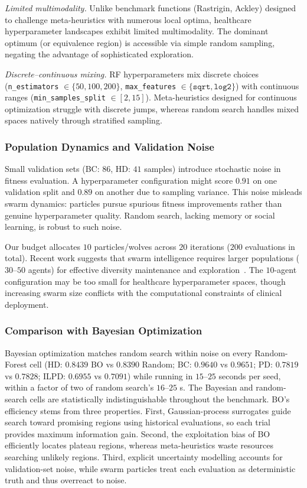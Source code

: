 \documentclass[letterpaper, 10 pt, conference]{ieeeconf}
\begin{document}
\emph{Limited multimodality.} Unlike benchmark functions (Rastrigin, Ackley) designed to challenge meta-heuristics with numerous local optima, healthcare hyperparameter landscapes exhibit limited multimodality. The dominant optimum (or equivalence region) is accessible via simple random sampling, negating the advantage of sophisticated exploration.

\emph{Discrete--continuous mixing.} RF hyperparameters mix discrete choices (\texttt{n\_estimators} $\in \{50, 100, 200\}$, \texttt{max\_features} $\in \{\texttt{sqrt}, \texttt{log2}\}$) with continuous ranges (\texttt{min\_samples\_split} $\in [2, 15]$). Meta-heuristics designed for continuous optimization struggle with discrete jumps, whereas random search handles mixed spaces natively through stratified sampling.

\subsubsection{Population Dynamics and Validation Noise}

Small validation sets (BC: $86$, HD: $41$ samples) introduce stochastic noise in fitness evaluation. A hyperparameter configuration might score $0.91$ on one validation split and $0.89$ on another due to sampling variance. This noise misleads swarm dynamics: particles pursue spurious fitness improvements rather than genuine hyperparameter quality. Random search, lacking memory or social learning, is robust to such noise.

Our budget allocates $10$ particles/wolves across $20$ iterations ($200$ evaluations in total). Recent work suggests that swarm intelligence requires larger populations ($30$--$50$ agents) for effective diversity maintenance and exploration~\cite{gong2015}. The $10$-agent configuration may be too small for healthcare hyperparameter spaces, though increasing swarm size conflicts with the computational constraints of clinical deployment.

\subsubsection{Comparison with Bayesian Optimization}

Bayesian optimization matches random search within noise on every Random-Forest cell (HD: $0.8439$ BO vs $0.8390$ Random; BC: $0.9640$ vs $0.9651$; PD: $0.7819$ vs $0.7828$; ILPD: $0.6955$ vs $0.7091$) while running in $15$--$25$ seconds per seed, within a factor of two of random search's $16$--$25$ s. The Bayesian and random-search cells are statistically indistinguishable throughout the benchmark. BO's efficiency stems from three properties. First, Gaussian-process surrogates guide search toward promising regions using historical evaluations, so each trial provides maximum information gain. Second, the exploitation bias of BO efficiently locates plateau regions, whereas meta-heuristics waste resources searching unlikely regions. Third, explicit uncertainty modelling accounts for validation-set noise, while swarm particles treat each evaluation as deterministic truth and thus overreact to noise.
\end{document}
